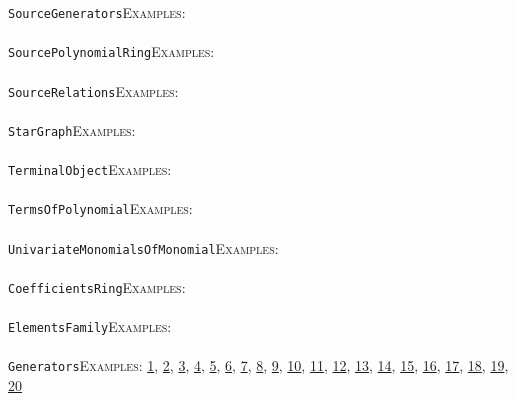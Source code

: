 \documentclass[a4paper,11pt]{report}
\begin{document}
{{ \texttt{SourceGenerators}{\nobreakspace}{\nobreakspace}{\nobreakspace}{\nobreakspace}\textsc{Examples:} \\
 \\
 \texttt{SourcePolynomialRing}{\nobreakspace}{\nobreakspace}{\nobreakspace}{\nobreakspace}\textsc{Examples:} \\
 \\
 \texttt{SourceRelations}{\nobreakspace}{\nobreakspace}{\nobreakspace}{\nobreakspace}\textsc{Examples:} \\
 \\
 \texttt{StarGraph}{\nobreakspace}{\nobreakspace}{\nobreakspace}{\nobreakspace}\textsc{Examples:} \\
 \\
 \texttt{TerminalObject}{\nobreakspace}{\nobreakspace}{\nobreakspace}{\nobreakspace}\textsc{Examples:} \\
 \\
 \texttt{TermsOfPolynomial}{\nobreakspace}{\nobreakspace}{\nobreakspace}{\nobreakspace}\textsc{Examples:} \\
 \\
 \texttt{UnivariateMonomialsOfMonomial}{\nobreakspace}{\nobreakspace}{\nobreakspace}{\nobreakspace}\textsc{Examples:} \\
 \\
 \texttt{CoefficientsRing}{\nobreakspace}{\nobreakspace}{\nobreakspace}{\nobreakspace}\textsc{Examples:} \\
 \\
 \texttt{ElementsFamily}{\nobreakspace}{\nobreakspace}{\nobreakspace}{\nobreakspace}\textsc{Examples:} \\
 \\
 \texttt{Generators}{\nobreakspace}{\nobreakspace}{\nobreakspace}{\nobreakspace}\textsc{Examples:} \href{tutorial/chap3.html} {1}{\nobreakspace}, \href{tutorial/chap7.html} {2}{\nobreakspace}, \href{tutorial/chap8.html} {3}{\nobreakspace}, \href{tutorial/chap10.html} {4}{\nobreakspace}, \href{../www/SideLinks/About/aboutModPRings.html} {5}{\nobreakspace}, \href{../www/SideLinks/About/aboutParallel.html} {6}{\nobreakspace}, \href{../www/SideLinks/About/aboutBredon.html} {7}{\nobreakspace}, \href{../www/SideLinks/About/aboutPerformance.html} {8}{\nobreakspace}, \href{../www/SideLinks/About/aboutPeriodic.html} {9}{\nobreakspace}, \href{../www/SideLinks/About/aboutCohomologyRings.html} {10}{\nobreakspace}, \href{../www/SideLinks/About/aboutCoveringSpaces.html} {11}{\nobreakspace}, \href{../www/SideLinks/About/aboutCoverinSpaces.html} {12}{\nobreakspace}, \href{../www/SideLinks/About/aboutRandomComplexes.html} {13}{\nobreakspace}, \href{../www/SideLinks/About/aboutExtensions.html} {14}{\nobreakspace}, \href{../www/SideLinks/About/aboutSpaceGroup.html} {15}{\nobreakspace}, \href{../www/SideLinks/About/aboutFunctorial.html} {16}{\nobreakspace}, \href{../www/SideLinks/About/aboutIntro.html} {17}{\nobreakspace}, \href{../www/SideLinks/About/aboutTopology.html} {18}{\nobreakspace}, \href{../www/SideLinks/About/aboutTorAndExt.html} {19}{\nobreakspace}, \href{../www/SideLinks/About/aboutTwistedCoefficients.html} {20}{\nobreakspace} \\
}}
\end{document}
